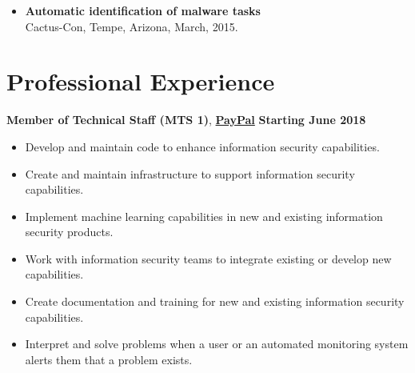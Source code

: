 \documentclass[margin,line]{CV}
\begin{document}
\begin{resume}
\begin{itemize}[leftmargin =*]
\item {\bf Automatic identification of malware tasks}\\
Cactus-Con, Tempe, Arizona, March, 2015.
\end{itemize}


\section{\sc Professional Experience}

{\bf Member of Technical Staff (MTS 1)}, \href{https://www.paypal.com/us/home}{\bf PayPal}  \hfill {\bf  Starting June 2018}
\begin{itemize}
	
	\item Develop and maintain code to enhance information security capabilities.
	\item Create and maintain infrastructure to support information security capabilities.
	\item Implement machine learning capabilities in new and existing information security products.
	\item Work with information security teams to integrate existing or develop new capabilities.
	\item Create documentation and training for new and existing information security capabilities.
	\item Interpret and solve problems when a user or an automated monitoring system alerts them that a problem exists.
	
\end{itemize}


\end{resume}
\end{document}
